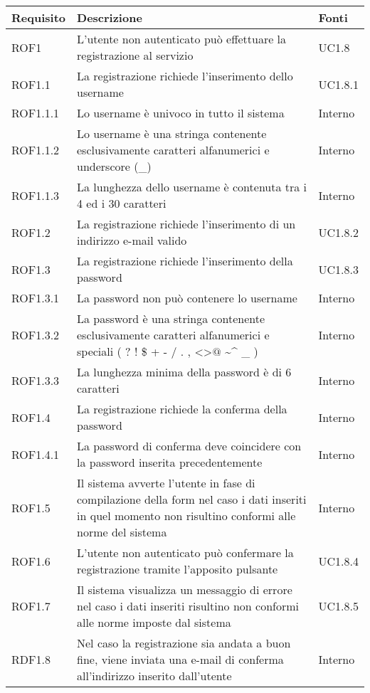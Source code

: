 \begin{center}

	\def\arraystretch{1.5}
	\bgroup
	\begin{longtable}{| p{2.5cm} | p{8cm} | p{2cm} |}

		\hline
		\textbf{Requisito} & \textbf{Descrizione} & \textbf{Fonti} \\
		\hline

		ROF1  &  L'utente non autenticato può effettuare la registrazione al servizio  &  UC1.8 \\
		\hline
		ROF1.1  &  La registrazione richiede l'inserimento dello username  &  UC1.8.1 \\
		\hline
		ROF1.1.1  &  Lo username è univoco in tutto il sistema  &  Interno \\
		\hline
		ROF1.1.2  &  Lo username è una stringa contenente esclusivamente caratteri alfanumerici e underscore (\_)  &  Interno \\
		\hline
		ROF1.1.3  &  La lunghezza dello username è contenuta tra i 4 ed i 30 caratteri  &  Interno \\
		\hline
		ROF1.2  &  La registrazione richiede l'inserimento di un indirizzo e-mail valido &  UC1.8.2 \\
		\hline
		ROF1.3  &  La registrazione richiede l'inserimento della password  &  UC1.8.3 \\
		\hline
		ROF1.3.1  &  La password non può contenere lo username  &  Interno \\
		\hline
		ROF1.3.2  &  La password è una stringa contenente esclusivamente caratteri alfanumerici e speciali ( ? ! \$ + - / . , \textless \textgreater $@$ \textasciitilde \^{} \_ )  &  Interno \\
		\hline
		ROF1.3.3  &  La lunghezza minima della password è di 6 caratteri  &  Interno \\
		\hline
		ROF1.4  &  La registrazione richiede la conferma della password  &  Interno \\
		\hline
		ROF1.4.1  &  La password di conferma deve coincidere con la password inserita precedentemente  &  Interno \\
		\hline
		ROF1.5  &  Il sistema avverte l'utente in fase di compilazione della form nel caso i dati inseriti in quel momento non risultino conformi alle norme del sistema  &  Interno \\
		\hline
		ROF1.6  &  L'utente non autenticato può confermare la registrazione tramite l'apposito pulsante  &  UC1.8.4 \\
		\hline
		ROF1.7  &  Il sistema visualizza un messaggio di errore nel caso i dati inseriti risultino non conformi alle norme imposte dal sistema  &  UC1.8.5 \\
		\hline
		RDF1.8  &  Nel caso la registrazione sia andata a buon fine, viene inviata una e-mail di conferma all'indirizzo inserito dall'utente  &  Interno \\
		\hline



\end{longtable}
\end{center}
